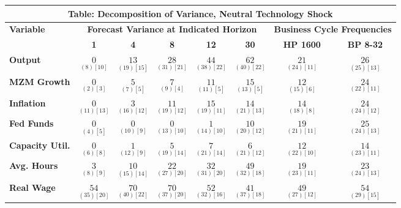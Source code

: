 \documentclass{article}
\begin{document}
 \begin{tabular}{|l|c|@{}c|c|@{}c|c|@{}c|c|} 
 \hline 
 \multicolumn{8}{|c|}{\textbf{Table: Decomposition of Variance, Neutral Technology Shock}} \\ \hline 
 \textbf{Variable} & \multicolumn{5}{|c}{\textbf{Forecast Variance at 
 Indicated Horizon}} & \multicolumn{2}{|c|}{\textbf{Business Cycle 
 Frequencies}} \\ \cline{2-8} 
 & \textbf{1} & \textbf{4} & \textbf{8} & \textbf{12} & \textbf{30} & \textbf{%
 HP 1600} & \textbf{BP 8-32} \\ \hline\hline 
 \textbf{Output} & $\underset{(  8) [ 10]}{  0}$ & $\underset{( 19) [ 15]}{ 13}$ & $\underset{( 31) [ 21]}{ 28}$ & $\underset{( 38) [ 22]}{ 44}$ & $\underset{( 40) [ 22]}{ 62}$ & $\underset{( 24) [ 11]}{ 21}$ & $\underset{( 25) [ 13]}{ 26}$ \\ \hline 
 \textbf{MZM Growth} & $\underset{(  2) [  3]}{  0}$ & $\underset{(  7) [  5]}{  5}$ & $\underset{(  9) [  4]}{  7}$ & $\underset{( 11) [  5]}{ 11}$ & $\underset{( 13) [  5]}{ 15}$ & $\underset{( 15) [  6]}{ 12}$ & $\underset{( 22) [ 11]}{ 24}$ \\ \hline 
 \textbf{Inflation} & $\underset{( 11) [ 13]}{  0}$ & $\underset{( 16) [ 12]}{  3}$ & $\underset{( 19) [ 12]}{ 11}$ & $\underset{( 19) [ 11]}{ 15}$ & $\underset{( 21) [ 13]}{ 14}$ & $\underset{( 18) [  8]}{ 14}$ & $\underset{( 24) [ 12]}{ 24}$ \\ \hline 
 \textbf{Fed Funds} & $\underset{(  4) [  5]}{  0}$ & $\underset{( 10) [  9]}{  0}$ & $\underset{( 13) [ 10]}{  0}$ & $\underset{( 14) [ 10]}{  1}$ & $\underset{( 20) [ 12]}{ 10}$ & $\underset{( 21) [ 11]}{ 19}$ & $\underset{( 24) [ 13]}{ 25}$ \\ \hline 
 \textbf{Capacity Util.} & $\underset{(  6) [  8]}{  0}$ & $\underset{( 12) [  9]}{  1}$ & $\underset{( 19) [ 14]}{  5}$ & $\underset{( 21) [ 14]}{  7}$ & $\underset{( 21) [ 12]}{  6}$ & $\underset{( 22) [ 10]}{ 12}$ & $\underset{( 23) [ 11]}{ 14}$ \\ \hline 
 \textbf{Avg. Hours} & $\underset{(  8) [  9]}{  3}$ & $\underset{( 15) [ 14]}{ 10}$ & $\underset{( 27) [ 20]}{ 22}$ & $\underset{( 31) [ 20]}{ 32}$ & $\underset{( 32) [ 18]}{ 49}$ & $\underset{( 23) [ 11]}{ 19}$ & $\underset{( 24) [ 13]}{ 23}$ \\ \hline 
 \textbf{Real Wage} &  $\underset{( 35) [ 20]}{ 54}$ & $\underset{( 40) [ 22]}{ 70}$ & $\underset{( 37) [ 20]}{ 70}$ & $\underset{( 32) [ 16]}{ 52}$ & $\underset{( 37) [ 18]}{ 41}$ & $\underset{( 27) [ 12]}{ 49}$ & $\underset{( 29) [ 15]}{ 54}$ \\ \hline 

\end{tabular}
\end{document}
